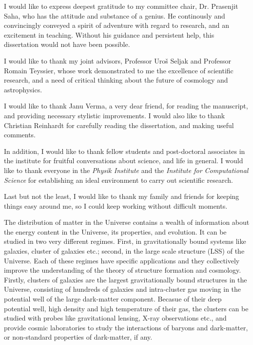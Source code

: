 \documentclass[
  11pt,
  twoside,
  openright,
  titlepage,
  headings=optiontoheadandtoc
]{scrbook}
\begin{document}
I would like to express deepest gratitude to my committee chair,
Dr. Prasenjit Saha, who has the attitude and substance of a genius.
He continously and convincingly conveyed a spirit of adventure
with regard to research, and an excitement in teaching.
Without his guidance and persistent help, this dissertation
would not have been possible.

I would like to thank my joint advisors, Professor Uro\v s Seljak and
Professor Romain Teyssier, whose work demonstrated to me the
excellence of scientific research, and a need of critical thinking
about the future of cosmology and astrophysics.

I would like to thank Janu Verma, a very dear friend, for reading
the manuscript, and providing necessary stylistic improvements.
I would also like to thank Christian Reinhardt for carefully
reading the dissertation, and making useful comments.

In addition, I would like to thank fellow students and post-doctoral
associates in the institute for fruitful conversations about
science, and life in general. I would like to thank everyone
in the {\it Physik Institute} and the {\it Institute for Computational Science}
for establishing an ideal environment to carry out scientific research.

Last but not the least, I would like to thank my family and
friends for keeping things easy around me, so I could
keep working without difficult moments.

\endgroup

\cleardoublepage
{}

\begingroup
\setlength{\parindent}{0pt}
\setlength{\parskip}{0.85em plus 0.15em minus 0.1em}

The distribution of matter in the Universe contains a wealth of information about
the energy content in the Universe, its properties, and evolution. It can
be studied in two very different regimes. First, in gravitationally
bound systems like galaxies, cluster of galaxies etc.; second, in the
large scale structure (LSS) of the Universe. Each of these regimes have specific
applications and they collectively improve the understanding of the theory of
structure formation and cosmology. Firstly, clusters of galaxies are
the largest gravitationally bound structures in the Universe, consisting
of hundreds of galaxies and intra-cluster gas moving in the potential well
of the large dark-matter component. Becasue of their deep potential well, high
density and high temperature of their gas, the clusters can be studied with probes like
gravitational lensing, X-ray observations etc., and provide cosmic
laboratories to study the interactions of baryons and dark-matter, or
non-standard properties of dark-matter, if any.
\end{document}
